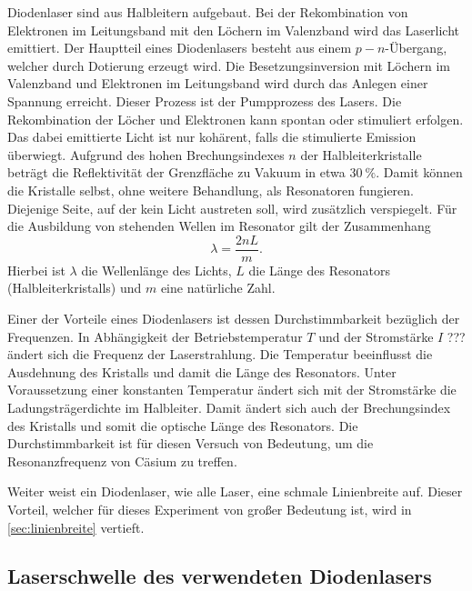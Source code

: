 \documentclass[../bericht.tex]{subfiles}
\begin{document}
      Diodenlaser sind aus Halbleitern aufgebaut. Bei der Rekombination von Elektronen im Leitungsband mit den L\"ochern im Valenzband wird das Laserlicht emittiert. Der Hauptteil eines Diodenlasers besteht aus einem $p-n$-\"Ubergang, welcher durch Dotierung erzeugt wird. Die Besetzungsinversion mit L\"ochern im Valenzband und Elektronen im Leitungsband wird durch das Anlegen einer Spannung erreicht. Dieser Prozess ist der Pumpprozess des Lasers. Die Rekombination der L\"ocher und Elektronen kann spontan oder stimuliert erfolgen. Das dabei emittierte Licht ist nur koh\"arent, falls die stimulierte Emission \"uberwiegt. Aufgrund des hohen Brechungsindexes $n$ der Halbleiterkristalle betr\"agt die Reflektivit\"at der Grenzfl\"ache zu Vakuum in etwa $\SI{30}{\percent}$. Damit k\"onnen die Kristalle selbst, ohne weitere Behandlung, als Resonatoren fungieren. Diejenige Seite, auf der kein Licht austreten soll, wird zus\"atzlich verspiegelt. F\"ur die Ausbildung von stehenden Wellen im Resonator gilt der Zusammenhang
      \begin{equation*}
        \lambda = \frac{2nL}{m}.
      \end{equation*}
      Hierbei ist $\lambda$ die Wellenl\"ange des Lichts, $L$ die L\"ange des Resonators (Halbleiterkristalls) und $m$ eine nat\"urliche Zahl.

      Einer der Vorteile eines Diodenlasers ist dessen Durchstimmbarkeit bez\"uglich der Frequenzen. In Abh\"angigkeit der Betriebstemperatur $T$ und der Stromst\"arke $I$ ??? \"andert sich die Frequenz der Laserstrahlung. Die Temperatur beeinflusst die Ausdehnung des Kristalls und damit die L\"ange des Resonators. Unter Voraussetzung einer konstanten Temperatur \"andert sich mit der Stromst\"arke die Ladungstr\"agerdichte im Halbleiter. Damit \"andert sich auch der Brechungsindex des Kristalls und somit die optische L\"ange des Resonators.
      Die Durchstimmbarkeit ist f\"ur diesen Versuch von Bedeutung, um die Resonanzfrequenz von C\"asium zu treffen.
      \medskip

      Weiter weist ein Diodenlaser, wie alle Laser, eine schmale Linienbreite auf. Dieser Vorteil, welcher für dieses Experiment von großer Bedeutung ist, wird in \cref{sec:linienbreite} vertieft.


      \subsection{Laserschwelle des verwendeten Diodenlasers}
      \label{subsec:laserschwelle}
\end{document}
